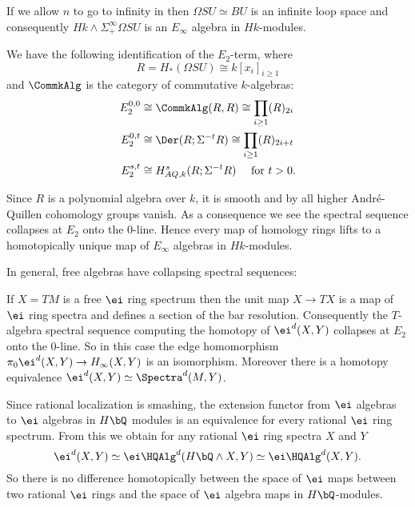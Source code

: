 \documentclass[leqno,oneside,english]{elsarticle}
\begin{document}
\begin{example}\label{ex:BU}
  If we allow $n$ to go to infinity in  then $\Omega
  SU\simeq BU$ is an infinite loop space and consequently $Hk\wedge
  \Sigma^{\infty}_{+} \Omega SU$ is an $E_{\infty}$ algebra in
  $Hk$-modules. 
  
We have the following identification of the
  $E_2$-term, where 
  \[
  R=H_*(\Omega SU)\cong k[x_i]_{i\geq 1}
  \]
  and $\CommkAlg$ is the category of commutative $k$-algebras:
  \begin{align*}
   E_2^{0,0} &\cong  \CommkAlg(R,R)\cong
   \prod_{i\geq 1} (R)_{2i}\\ 
    E_2^{0,t} & \cong  \Der(R;\Sigma^{-t}R)\cong 
   \prod_{i\geq 1} (R)_{2i+t}\\ 
      E_2^{s,t} & \cong H_{AQ,k}^{s}(R;\Sigma^{-t}R) \quad \text{ for } t>0.
   \end{align*}
   
  Since $R$ is a polynomial algebra over $k$, it is smooth and by
   all higher Andr\'e-Quillen cohomology
  groups vanish. As a consequence we see the spectral sequence
  collapses at $E_2$ onto the 0-line. Hence every map of homology rings
  lifts to a homotopically unique map of $E_{\infty}$ algebras in
  $Hk$-modules.
\end{example}

In general, free algebras have collapsing spectral sequences:
\begin{example}\label{ex:free}
  If $X=T M$ is a free $\ei$ ring spectrum then the unit map
  $X\rightarrow TX$ is a map of $\ei$ ring spectra and defines a
  section of the bar resolution. Consequently the $T$-algebra spectral sequence
  computing the homotopy of $\ei^d(X,Y)$ collapses at
  $E_2$ onto the 0-line. So in this case the edge homomorphism 
  $\pi_0 \ei^d(X,Y)\rightarrow H_{\infty}(X,Y)$ is an isomorphism.
  Moreover there is a homotopy equivalence $\ei^d(X,Y)\simeq \Spectra^d(M,Y)$.
\end{example}

\begin{rem}
Since rational localization is smashing, the extension functor from
$\ei$ algebras to $\ei$ algebras in $H\bQ$ modules is an equivalence for
every rational $\ei$ ring spectrum. From this we obtain for any rational
$\ei$ ring spectra $X$ and $Y$ 
\[
\ei^d(X,Y)\simeq  {\ei}\HQAlg^d(H\bQ\wedge X, Y)\simeq {\ei}\HQAlg^d(X,Y). 
\] 
So there is no difference homotopically between the space of
$\ei$ maps between two rational $\ei$ rings and the space of
$\ei$ algebra maps in $H\bQ$-modules.
\end{rem}
\end{document}
